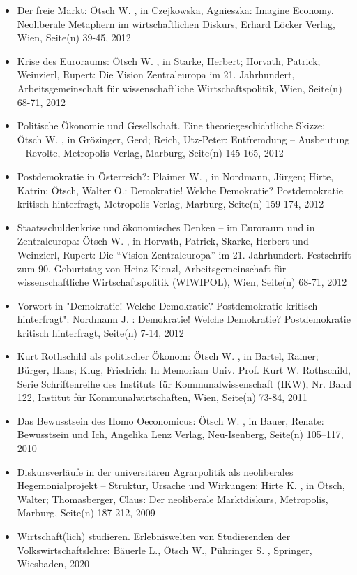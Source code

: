 \begin{itemize}
\item Der freie Markt: Ötsch W. , in Czejkowska, Agnieszka: Imagine Economy. Neoliberale Metaphern im wirtschaftlichen Diskurs, Erhard Löcker Verlag, Wien, Seite(n) 39-45, 2012
\item Krise des Euroraums: Ötsch W. , in Starke, Herbert; Horvath, Patrick; Weinzierl, Rupert: Die Vision Zentraleuropa im 21. Jahrhundert, Arbeitsgemeinschaft für wissenschaftliche Wirtschaftspolitik, Wien, Seite(n) 68-71, 2012
\item Politische Ökonomie und Gesellschaft. Eine theoriegeschichtliche Skizze: Ötsch W. , in Grözinger, Gerd; Reich, Utz-Peter: Entfremdung – Ausbeutung – Revolte, Metropolis Verlag, Marburg, Seite(n) 145-165, 2012
\item Postdemokratie in Österreich?: Plaimer W. , in Nordmann, Jürgen; Hirte, Katrin; Ötsch, Walter O.: Demokratie! Welche Demokratie? Postdemokratie kritisch hinterfragt, Metropolis Verlag, Marburg, Seite(n) 159-174, 2012
\item Staatsschuldenkrise und ökonomisches Denken – im Euroraum und in Zentraleuropa: Ötsch W. , in Horvath, Patrick, Skarke, Herbert  und Weinzierl, Rupert: Die “Vision Zentraleuropa” im 21. Jahrhundert. Festschrift zum 90. Geburtstag von Heinz Kienzl, Arbeitsgemeinschaft für wissenschaftliche Wirtschaftspolitik (WIWIPOL), Wien, Seite(n) 68-71, 2012
\item Vorwort in "Demokratie! Welche Demokratie? Postdemokratie kritisch hinterfragt": Nordmann J. : Demokratie! Welche Demokratie? Postdemokratie kritisch hinterfragt, Seite(n) 7-14, 2012
\item Kurt Rothschild als politischer Ökonom: Ötsch W. , in Bartel, Rainer; Bürger, Hans; Klug, Friedrich: In Memoriam Univ. Prof. Kurt W. Rothschild, Serie Schriftenreihe des Instituts für Kommunalwissenschaft (IKW), Nr. Band 122, Institut für Kommunalwirtschaften, Wien, Seite(n) 73-84, 2011
\item Das Bewusstsein des Homo Oeconomicus: Ötsch W. , in Bauer, Renate: Bewusstsein und Ich, Angelika Lenz Verlag, Neu-Isenberg, Seite(n) 105–117, 2010
\item Diskursverläufe in der universitären Agrarpolitik als neoliberales Hegemonialprojekt – Struktur, Ursache und Wirkungen: Hirte K. , in Ötsch, Walter; Thomasberger, Claus: Der neoliberale Marktdiskurs, Metropolis, Marburg, Seite(n) 187-212, 2009
\item Wirtschaft(lich) studieren. Erlebniswelten von Studierenden der Volkswirtschaftslehre: Bäuerle L., Ötsch W., Pühringer S. , Springer, Wiesbaden, 2020

\end{itemize}
